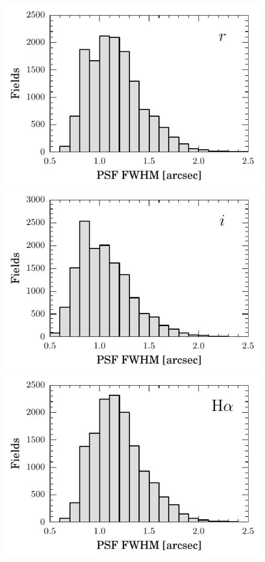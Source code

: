 \documentclass[useAMS,usenatbib]{mn2e}
\begin{document}
\begin{figure}
    \begin{minipage}[b]{\linewidth}
        \includegraphics[width=\textwidth]{figures/seeing/seeing_r.pdf} 
    \end{minipage}
    \begin{minipage}[b]{\linewidth}
        \includegraphics[width=\textwidth]{figures/seeing/seeing_i.pdf} 
    \end{minipage}
    \begin{minipage}[b]{\linewidth}
        \includegraphics[width=\textwidth]{figures/seeing/seeing_ha.pdf} 

\end{minipage}
\end{figure}
\end{document}
